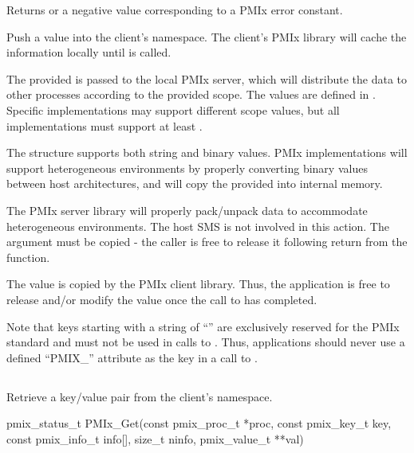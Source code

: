 Returns  or a negative value corresponding to a PMIx error constant.

\descr

Push a value into the client's namespace.
The client's \ac{PMIx} library will cache the information locally until  is called.

The provided  is passed to the local PMIx server, which will distribute the data to other processes according to the provided scope.
The  values are defined in .
Specific implementations may support different scope values, but all implementations must support at least .

The  structure supports both string and binary values.
PMIx implementations will support heterogeneous environments by properly converting binary values between host architectures, and will copy the provided  into internal memory.

\adviceimplstart
The PMIx server library will properly pack/unpack data to accommodate heterogeneous environments. The host \ac{SMS} is not involved in this action. The  argument must be copied - the caller is free to release it following return from the function.
\adviceimplend

\adviceuserstart
The value is copied by the PMIx client library. Thus, the application is free to release and/or modify the value once the call to  has completed.

Note that keys starting with a string of ``'' are exclusively reserved for the \ac{PMIx} standard and must not be used in calls to . Thus, applications should never use a defined ``PMIX_'' attribute as the key in a call to .
\adviceuserend


\subsection{}

\summary

Retrieve a key/value pair from the client's namespace.

\format

\cspecificstart
\begin{codepar}
pmix_status_t
PMIx_Get(const pmix_proc_t *proc, const pmix_key_t key,
         const pmix_info_t info[], size_t ninfo,
         pmix_value_t **val)
\end{codepar}
\cspecificend

